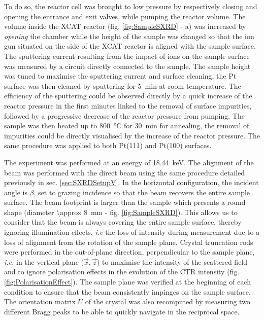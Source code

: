 To do so, the reactor cell was brought to low pressure by respectively closing and opening the entrance and exit valves, while pumping the reactor volume.
The volume inside the XCAT reactor (fig. \ref{fig:SampleSXRD} - a) was increased by \textit{opening} the chamber while the height of the sample was changed so that the ion gun situated on the side of the XCAT reactor is aligned with the sample surface.
The sputtering current resulting from the impact of ions on the sample surface was measured by a circuit directly connected to the sample.
The sample height was tuned to maximise the sputtering current and surface cleaning, the Pt surface was then cleaned by sputtering for \qty{5}{\minute} at room temperature.
The efficiency of the sputtering could be observed directly by a quick increase of the reactor pressure in the first minutes linked to the removal of surface impurities, followed by a progressive decrease of the reactor pressure from pumping.
The sample was then heated up to \qty{800}{\degreeCelsius} for \qty{30}{\minute} for annealing, the removal of impurities could be directly visualised by the increase of the reactor pressure.
The same procedure was applied to both Pt(111) and Pt(100) surfaces.

The experiment was performed at an energy of \qty{18.44}{\keV}.
The alignment of the beam was performed with the direct beam using the same procedure detailed previously in sec. \ref{sec:SXRDSetupV}.
In the horizontal configuration, the incident angle is $\beta$, set to grazing incidence so that the beam recovers the entire sample surface.
The beam footprint is larger than the sample which presents a round shape (diameter \qty{\approx 8}{\mm} - fig. \ref{fig:SampleSXRD}).
This allows us to consider that the beam is always covering the entire sample surface, thereby ignoring illumination effects, \textit{i.e} the loss of intensity during measurement due to a loss of alignment from the rotation of the sample plane.
Crystal truncation rods were performed in the out-of-plane direction, perpendicular to the sample plane, \textit{i.e.} in the vertical plane ($\vec{x}, \vec{z}$) to maximise the intensity of the scattered field and to ignore polarisation effects in the evolution of the CTR intensity (fig. \ref{fig:PolarisationEffect}).
The sample plane was verified at the beginning of each condition to ensure that the beam consistently impinges on the sample surface.
The orientation matrix $U$ of the crystal \parencite{Schleputz2011} was also recomputed by measuring two different Bragg peaks to be able to quickly navigate in the reciprocal space.


